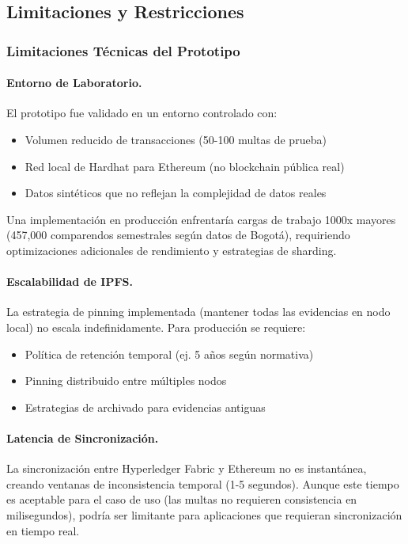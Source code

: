 \subsection{Limitaciones y Restricciones}

\subsubsection{Limitaciones Técnicas del Prototipo}

\paragraph{Entorno de Laboratorio.}
El prototipo fue validado en un entorno controlado con:
\begin{itemize}
    \item Volumen reducido de transacciones (50-100 multas de prueba)
    \item Red local de Hardhat para Ethereum (no blockchain pública real)
    \item Datos sintéticos que no reflejan la complejidad de datos reales
\end{itemize}

Una implementación en producción enfrentaría cargas de trabajo 1000x mayores (457,000 comparendos semestrales según datos de Bogotá), requiriendo optimizaciones adicionales de rendimiento y estrategias de sharding.

\paragraph{Escalabilidad de IPFS.}
La estrategia de pinning implementada (mantener todas las evidencias en nodo local) no escala indefinidamente. Para producción se requiere:
\begin{itemize}
    \item Política de retención temporal (ej. 5 años según normativa)
    \item Pinning distribuido entre múltiples nodos
    \item Estrategias de archivado para evidencias antiguas
\end{itemize}

\paragraph{Latencia de Sincronización.}
La sincronización entre Hyperledger Fabric y Ethereum no es instantánea, creando ventanas de inconsistencia temporal (1-5 segundos). Aunque este tiempo es aceptable para el caso de uso (las multas no requieren consistencia en milisegundos), podría ser limitante para aplicaciones que requieran sincronización en tiempo real.

